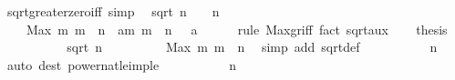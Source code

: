 \begin{isabellebody}
\isamarkupfalse%
%
\endisatagproof
{\isafoldproof}%
%
\isadelimproof
\isanewline
%
\endisadelimproof
\isanewline
{}\isamarkupfalse%
\ sqrt{\isacharunderscore}greater{\isacharunderscore}zero{\isacharunderscore}iff\ {\isacharbrackleft}simp{\isacharbrackright}{\isacharcolon}\isanewline
\ \ {\isachardoublequoteopen}sqrt\ n\ {\isachargreater}\ {}\ {\isasymlongleftrightarrow}\ n\ {\isachargreater}\ {}{\isachardoublequoteclose}\isanewline
%
\isadelimproof
%
\endisadelimproof
%
\isatagproof
{}\isamarkupfalse%
\ {\isacharminus}\isanewline
\ \ \isamarkupfalse%
\ {\isacharasterisk}{\isacharcolon}\ {\isachardoublequoteopen}{}\ {\isacharless}\ Max\ {\isacharbraceleft}m{\isachardot}\ m\ {\isasymle}\ n{\isacharbraceright}\ {\isasymlongleftrightarrow}\ {\isacharparenleft}{\isasymexists}a{\isasymin}{\isacharbraceleft}m{\isachardot}\ m\ {\isasymle}\ n{\isacharbraceright}{\isachardot}\ {}\ {\isacharless}\ a{\isacharparenright}{\isachardoublequoteclose}\isanewline
\ \ \ \ \isamarkupfalse%
\ {\isacharparenleft}rule\ Max{\isacharunderscore}gr{\isacharunderscore}iff{\isacharparenright}\ {\isacharparenleft}fact\ sqrt{\isacharunderscore}aux{\isacharparenright}{\isacharplus}\isanewline
\ \ \isamarkupfalse%
\ {\isacharquery}thesis\isanewline
\ \ \isamarkupfalse%
\isanewline
\ \ \ \ \isamarkupfalse%
\ {\isachardoublequoteopen}{}\ {\isacharless}\ sqrt\ n{\isachardoublequoteclose}\isanewline
\ \ \ \ \isamarkupfalse%
\ \isamarkupfalse%
\ {\isachardoublequoteopen}{}\ {\isacharless}\ Max\ {\isacharbraceleft}m{\isachardot}\ m\ {\isasymle}\ n{\isacharbraceright}{\isachardoublequoteclose}\ \isamarkupfalse%
\ {\isacharparenleft}simp\ add{\isacharcolon}\ sqrt{\isacharunderscore}def{\isacharparenright}\isanewline
\ \ \ \ \isamarkupfalse%
\ {\isacharasterisk}\ \isamarkupfalse%
\ {\isachardoublequoteopen}{}\ {\isacharless}\ n{\isachardoublequoteclose}\ \isamarkupfalse%
\ {\isacharparenleft}auto\ dest{\isacharcolon}\ power{}{\isacharunderscore}nat{\isacharunderscore}le{\isacharunderscore}imp{\isacharunderscore}le{\isacharparenright}\isanewline
\ \ \isamarkupfalse%
\isanewline
\ \ \ \ \isamarkupfalse%
\ {\isachardoublequoteopen}{}\ {\isacharless}\ n{\isachardoublequoteclose}\isanewline

\end{isabellebody}
